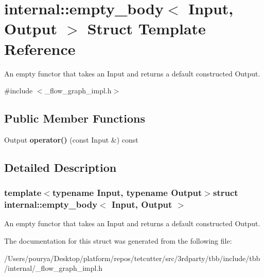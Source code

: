 \hypertarget{structinternal_1_1empty__body}{}\section{internal\+:\+:empty\+\_\+body$<$ Input, Output $>$ Struct Template Reference}
\label{structinternal_1_1empty__body}


An empty functor that takes an Input and returns a default constructed Output.  




{\ttfamily \#include $<$\+\_\+flow\+\_\+graph\+\_\+impl.\+h$>$}

\subsection*{Public Member Functions}
\begin{DoxyCompactItemize}
\item 
\hypertarget{structinternal_1_1empty__body_abeed1c1ca92f93658f88600a872b5432}{}Output {\bfseries operator()} (const Input \&) const \label{structinternal_1_1empty__body_abeed1c1ca92f93658f88600a872b5432}

\end{DoxyCompactItemize}


\subsection{Detailed Description}
\subsubsection*{template$<$typename Input, typename Output$>$struct internal\+::empty\+\_\+body$<$ Input, Output $>$}

An empty functor that takes an Input and returns a default constructed Output. 

The documentation for this struct was generated from the following file\+:\begin{DoxyCompactItemize}
\item 
/\+Users/pourya/\+Desktop/platform/repos/tetcutter/src/3rdparty/tbb/include/tbb/internal/\+\_\+flow\+\_\+graph\+\_\+impl.\+h\end{DoxyCompactItemize}
